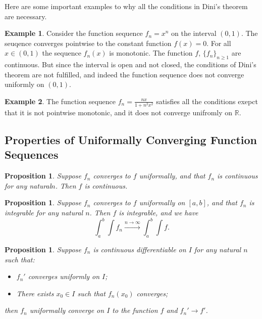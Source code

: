 \documentclass[11pt,a4paper]{article}
\theoremstyle{definition}
\newtheorem{example}{Example}[section]
\theoremstyle{plain}
\newtheorem{proposition}[theorem]{Proposition}
\newcommand{\R}{\mathbb{R}}
\begin{document}
  Here are some important examples to why all the conditions in Dini's theorem
  are necessary.

  \begin{example}
    Consider the function sequence $f_n = x^n$ on the interval $(0,1)$.
    The seuqence converges pointwise to the constant function $f(x) = 0$.
    For all $x \in (0,1)$ the sequence $f_n(x)$ is monotonic.
    The function $f$, $\{f_n\}_{n \geq 1}$ are continuous.
    But since the interval is open and not closed, the conditions of
    Dini's theorem are not fulfilled, and indeed the function sequence
    does not converge uniformly on $(0,1)$.
  \end{example}

  \begin{example}
    The function sequence $f_n = \frac{n x}{1 + n^2 x^2}$ satisfies all
    the conditions exepct that it is not pointwise monotonic, and it
    does not converge unifromly on $\R$.
  \end{example}

  \subsection{Properties of Uniformally Converging Function Sequences}
  \begin{proposition}
    Suppose $f_n$ converges to $f$ uniformally, and that $f_n$ is
    continuous for any natural$n$. Then $f$ is continuous.
  \end{proposition}


  \begin{proposition}
    Suppose $f_n$ converges to $f$ uniformally on $[a,b]$,
    and that $f_n$ is integrable for any natural $n$.
    Then $f$ is integrable, and we have
    \[
      \int_{a}^{b} \int f_n \xrightarrow{n \to \infty}
      \int_{a}^{b} \int f.
    \]
  \end{proposition}

  \begin{proposition}
    Suppose $f_n$ is continuous differentiable on $I$ for any natural $n$
    such that:
    \begin{itemize}
      \item  $f_n'$ converges  uniformly on $I$;
      \item There exists $x_0 \in I$ such that $f_n(x_0)$ converges;
    \end{itemize}
    then $f_n$ uniformally converge on $I$ to the function $f$ and
    $f_n'\to f'$.
  \end{proposition}
\end{document}
